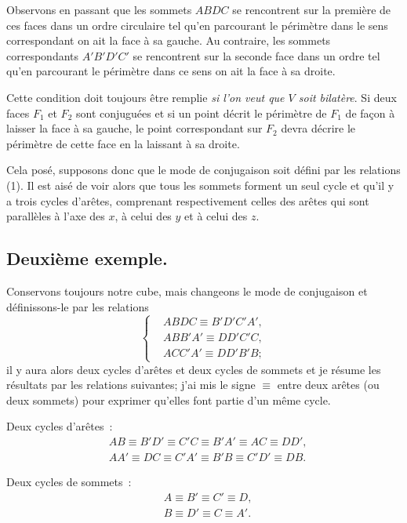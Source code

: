 \documentclass{article}
\begin{document}
Observons en passant que les sommets $ABDC$ se rencontrent sur la première de ces faces dans un ordre circulaire tel qu'en parcourant le périmètre dans le sens correspondant on ait la face à sa gauche. Au contraire, les sommets correspondants $A'B'D'C'$ se rencontrent sur la seconde face dans un ordre tel qu'en parcourant le périmètre dans ce sens on ait la face à sa droite.

Cette condition doit toujours être remplie \emph{si l'on veut que $V$ soit bilatère}. Si deux faces $F_{1}$ et $F_{2}$ sont conjuguées et si un point décrit le périmètre de $F_{1}$ de façon à laisser la face à sa gauche, le point correspondant sur $F_{2}$ devra décrire le périmètre de cette face en la laissant à sa droite.

Cela posé, supposons donc que le mode de conjugaison soit défini par les relations (1). Il est aisé de voir alors que tous les sommets forment un seul cycle et qu'il y a trois cycles d'arêtes, comprenant respectivement celles des arêtes qui sont parallèles à l'axe des $x$, à celui des $y$ et à celui des $z$.

\subsection*{Deuxième exemple.}

Conservons toujours notre cube, mais changeons le mode de conjugaison et définissons-le par les relations
\[ \left\{ \begin{aligned} &ABDC \equiv B'D'C'A',\\ &ABB'A' \equiv DD'C'C,\\ &ACC'A' \equiv DD'B'B; \end{aligned} \right. \tag{2} \]
il y aura alors deux cycles d'arêtes et deux cycles de sommets et je résume les résultats par les relations suivantes; j'ai mis le signe $\equiv$ entre deux arêtes (ou deux sommets) pour exprimer qu'elles font partie d'un même cycle.

Deux cycles d'arêtes~:
\[ \begin{aligned} &AB \equiv B'D' \equiv C'C \equiv B'A' \equiv AC \equiv DD',\\ &AA' \equiv DC \equiv C'A' \equiv B'B \equiv C'D' \equiv DB. \end{aligned} \]

Deux cycles de sommets~:
\[ \begin{aligned} &A \equiv B' \equiv C' \equiv D,\\ &B \equiv D' \equiv C \equiv A'. \end{aligned} \]
\end{document}
